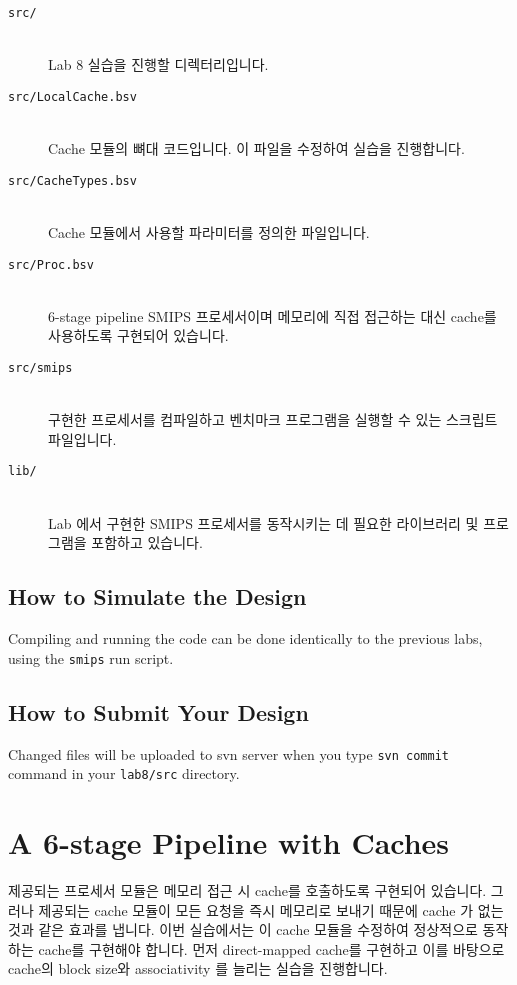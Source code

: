 \documentclass{article}
\begin{document}
\begin{description}
\item [\texttt{src/}]\hfill \ \\
	Lab 8 실습을 진행할 디렉터리입니다.

\item [\texttt{src/LocalCache.bsv}]\hfill \ \\
	Cache 모듈의 뼈대 코드입니다. 이 파일을 수정하여 실습을 진행합니다.

\item [\texttt{src/CacheTypes.bsv}]\hfill \ \\
	Cache 모듈에서 사용할 파라미터를 정의한 파일입니다.

\item [\texttt{src/Proc.bsv}]\hfill \ \\
	6-stage pipeline SMIPS 프로세서이며 메모리에 직접 접근하는 대신 cache를 사용하도록 구현되어 있습니다.

\item [\texttt{src/smips}]\hfill \ \\
	구현한 프로세서를 컴파일하고 벤치마크 프로그램을 실행할 수 있는 스크립트 파일입니다.

\item [\texttt{lib/}]\hfill \ \\
	Lab 에서 구현한 SMIPS 프로세서를 동작시키는 데 필요한 라이브러리 및 프로그램을 포함하고 있습니다.
\end{description}

\subsection{How to Simulate the Design}
Compiling and running the code can be done identically to the previous
labs, using the \texttt{smips} run script.


\subsection{How to Submit Your Design}
Changed files will be uploaded to svn server when you type \texttt{svn commit} command
in your \texttt{lab8/src} directory.

\section{A 6-stage Pipeline with Caches}
제공되는 프로세서 모듈은 메모리 접근 시 cache를 호출하도록 구현되어 있습니다.
그러나 제공되는 cache 모듈이 모든 요청을 즉시 메모리로 보내기 때문에
cache 가 없는 것과 같은 효과를 냅니다.
이번 실습에서는 이 cache 모듈을 수정하여 정상적으로 동작하는 cache를 구현해야 합니다.
먼저 direct-mapped cache를 구현하고 이를 바탕으로
cache의 block size와 associativity 를 늘리는 실습을 진행합니다.
\end{document}
